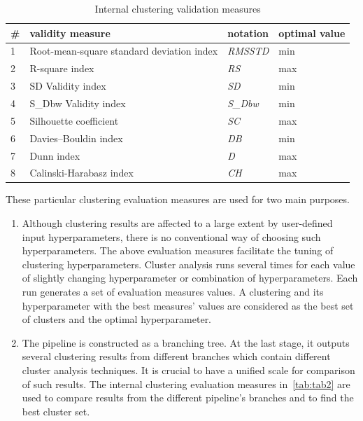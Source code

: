 \begin{table}[H]
\begin{center}
\begin{tabular}{ | m{0.7em} | m{8cm}| m{1.5cm} | m{2.6cm} |} 
\hline
\textbf{\#} & \textbf{validity measure} & \textbf{notation} & \textbf{optimal value} \\ 
\hline
1 & Root-mean-square standard deviation index & \textit{RMSSTD} & min \\ 
\hline
2 & R-square index & \textit{RS} & max \\ 
\hline
3 & SD Validity index  & \textit{SD} & min \\ 
\hline
4 & S\_Dbw Validity index   & \textit{S\_Dbw} & min \\ 
\hline
5 & Silhouette coefficient & \textit{SC} & max \\ 
\hline
6 & Davies–Bouldin index & \textit{DB} & min \\
\hline
7 & Dunn index & \textit{D} &  max \\
\hline
8 & Calinski-Harabasz index & \textit{CH} &  max \\
\hline
\end{tabular}
\caption {Internal clustering validation measures}
\label{tab:tab2}
\end{center}
\end {table}

These particular clustering evaluation measures are used for two main purposes.
\begin{enumerate}
  \item Although clustering results are affected to a large extent by user-defined input hyperparameters, there is no conventional way of choosing such hyperparameters. The above evaluation measures facilitate the tuning of clustering hyperparameters. Cluster analysis runs several times for each value of slightly changing hyperparameter or combination of hyperparameters. Each run generates a set of evaluation measures values. A clustering and its hyperparameter with the best measures' values are considered as the best set of clusters and the optimal hyperparameter.
  \item The pipeline is constructed as a branching tree. At the last stage, it outputs several clustering results from different branches which contain different cluster analysis techniques. It is crucial to have a unified scale for comparison of such results. The internal clustering evaluation measures in~\autoref{tab:tab2} are used to compare results from the different pipeline's branches and to find the best cluster set.
\end{enumerate}

